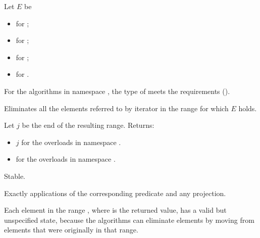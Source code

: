 \begin{itemdescr}
\pnum
Let $E$ be
\begin{itemize}
\item {} for ;
\item {} for ;
\item {} for ;
\item {} for .
\end{itemize}

\pnum
\expects
For the algorithms in namespace ,
the type of 
meets the  requirements ().

\pnum
\effects
Eliminates all the elements referred to by iterator 
in the range  for which $E$ holds.

\pnum
\returns
Let $j$ be the end of the resulting range. Returns:
\begin{itemize}
\item $j$ for the overloads in namespace .
\item {} for the overloads in namespace .
\end{itemize}

\pnum
\remarks
Stable.

\pnum
\complexity
Exactly  applications
of the corresponding predicate and any projection.

\pnum
\begin{note}
Each element in the range ,
where  is the returned value,
has a valid but unspecified state,
because the algorithms can eliminate elements
by moving from elements that were originally in that range.
\end{note}
\end{itemdescr}

